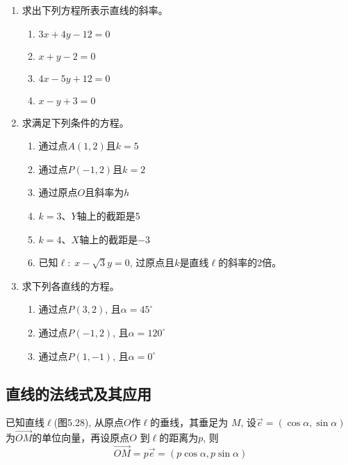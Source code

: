 \begin{ex}
\begin{enumerate}
    \item 求出下列方程所表示直线的斜率。
\begin{multicols}{2}
\begin{enumerate}
    \item $3x+4y-12=0$
    \item $x+y-2=0$
    \item $4x-5y+12=0$
    \item $x-y+3=0$
\end{enumerate}
\end{multicols}

\item 求满足下列条件的方程。
\begin{enumerate}
    \item 通过点$A(1,2)$且$k=5$
    \item 通过点$P(-1,2)$且$k=2$
    \item 通过原点$O$且斜率为$h$
    \item $k=3$、$Y$轴上的截距是5
    \item $k=4$、$X$轴上的截距是$-3$
    \item 已知$\ell:\; x-\sqrt{3}y=0$, 过原点且$k$是直线$\ell$的斜率的2倍。
\end{enumerate}

\item 求下列各直线的方程。
\begin{enumerate}
    \item 通过点$P(3,2)$, 且$\alpha=45^{\circ}$
    \item 通过点$P(-1,2)$, 且$\alpha=120^{\circ}$
    \item 通过点$P(1,-1)$, 且$\alpha=0^{\circ}$
\end{enumerate}
\end{enumerate}
\end{ex}

\subsection{直线的法线式及其应用}
已知直线$\ell$(图5.28), 
从原点$O$作$\ell$的垂线，其垂足为
$M$, 设$\vec{e}=(\cos\alpha,\sin\alpha)$
为$\Vec{OM}$的单位向量，再设原点$O$
到$\ell$的距离为$p$, 则
\[\Vec{OM}=p\vec{e}=(p\cos\alpha, p\sin\alpha)\]

\begin{figure}[htp]
    \centering
    \caption{}
\end{figure}


